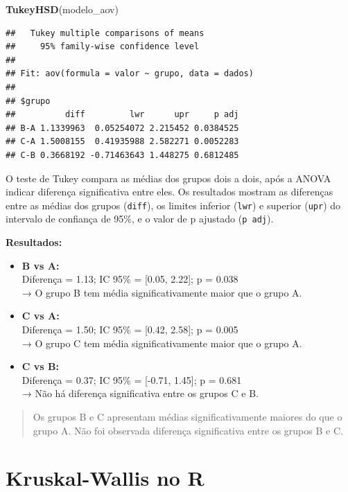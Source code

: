 \documentclass[
]{book}
\newenvironment{Shaded}{\begin{snugshade}}{\end{snugshade}}
\newcommand{\FunctionTok}[1]{\textcolor[rgb]{0.13,0.29,0.53}{\textbf{#1}}}
\newcommand{\NormalTok}[1]{#1}
\begin{document}
\begin{Shaded}
\begin{Highlighting}[]
\FunctionTok{TukeyHSD}\NormalTok{(modelo\_aov)}
\end{Highlighting}
\end{Shaded}

\begin{verbatim}
##   Tukey multiple comparisons of means
##     95% family-wise confidence level
## 
## Fit: aov(formula = valor ~ grupo, data = dados)
## 
## $grupo
##          diff         lwr      upr     p adj
## B-A 1.1339963  0.05254072 2.215452 0.0384525
## C-A 1.5008155  0.41935988 2.582271 0.0052283
## C-B 0.3668192 -0.71463643 1.448275 0.6812485
\end{verbatim}

O teste de Tukey compara as médias dos grupos dois a dois, após a ANOVA indicar diferença significativa entre eles. Os resultados mostram as diferenças entre as médias dos grupos (\texttt{diff}), os limites inferior (\texttt{lwr}) e superior (\texttt{upr}) do intervalo de confiança de 95\%, e o valor de p ajustado (\texttt{p\ adj}).

\textbf{Resultados:}

\begin{itemize}
\item
  \textbf{B vs A:}\\
  Diferença = 1.13; IC 95\% = {[}0.05, 2.22{]}; p = 0.038\\
  → O grupo B tem média significativamente maior que o grupo A.
\item
  \textbf{C vs A:}\\
  Diferença = 1.50; IC 95\% = {[}0.42, 2.58{]}; p = 0.005\\
  → O grupo C tem média significativamente maior que o grupo A.
\item
  \textbf{C vs B:}\\
  Diferença = 0.37; IC 95\% = {[}-0.71, 1.45{]}; p = 0.681\\
  → Não há diferença significativa entre os grupos C e B.
\end{itemize}

\begin{quote}
Os grupos B e C apresentam médias significativamente maiores do que o grupo A. Não foi observada diferença significativa entre os grupos B e C.
\end{quote}

\section{Kruskal-Wallis no R}\label{kruskal-wallis-no-r}
\end{document}
